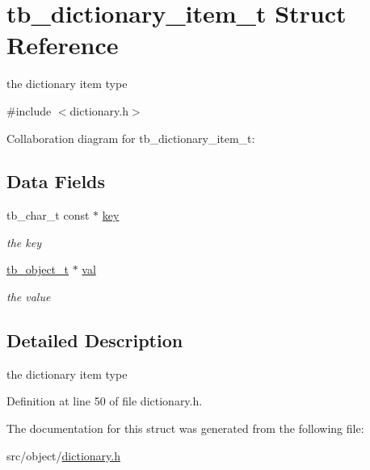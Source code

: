 \hypertarget{structtb__dictionary__item__t}{\section{tb\-\_\-dictionary\-\_\-item\-\_\-t Struct Reference}
\label{structtb__dictionary__item__t}
}


the dictionary item type  




{\ttfamily \#include $<$dictionary.\-h$>$}



Collaboration diagram for tb\-\_\-dictionary\-\_\-item\-\_\-t\-:
\subsection*{Data Fields}
\begin{DoxyCompactItemize}
\item 
\hypertarget{structtb__dictionary__item__t_aa6f539cd8a53dab75c0450402ab3300d}{tb\-\_\-char\-\_\-t const $\ast$ \hyperlink{structtb__dictionary__item__t_aa6f539cd8a53dab75c0450402ab3300d}{key}}\label{structtb__dictionary__item__t_aa6f539cd8a53dab75c0450402ab3300d}

\begin{DoxyCompactList}\small\item\em the key \end{DoxyCompactList}\item 
\hypertarget{structtb__dictionary__item__t_a9567e4c557a5d42994d9a22172520d40}{\hyperlink{structtb__object__t}{tb\-\_\-object\-\_\-t} $\ast$ \hyperlink{structtb__dictionary__item__t_a9567e4c557a5d42994d9a22172520d40}{val}}\label{structtb__dictionary__item__t_a9567e4c557a5d42994d9a22172520d40}

\begin{DoxyCompactList}\small\item\em the value \end{DoxyCompactList}\end{DoxyCompactItemize}


\subsection{Detailed Description}
the dictionary item type 

Definition at line 50 of file dictionary.\-h.



The documentation for this struct was generated from the following file\-:\begin{DoxyCompactItemize}
\item 
src/object/\hyperlink{dictionary_8h}{dictionary.\-h}\end{DoxyCompactItemize}
